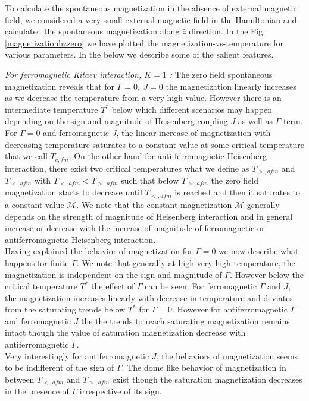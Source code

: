 \documentclass[aps,amsmath,twocolumn,amssymb,floatfix,showpacs,superscriptaddress,nofootinbib,longbibliography]{revtex4-1}
\begin{document}
To calculate the spontaneous magnetization in the absence of external magnetic field, we considered a very small external magnetic field in the Hamiltonian and calculated the spontaneous magnetization along $\hat{z}$ direction. In the Fig. \ref{magnetizationhzzero} we have plotted the magnetization-vs-temperature for various parameters. In the below we describe some of the salient features.\\ 
\indent 

{\it \small{For ferromagnetic Kitaev interaction, $K=1$ :}} The zero field spontaneous magnetization reveals that for $\Gamma=0,~J=0$ the magnetization linearly increases as we decrease the temperature from a very high value. However there is an intermediate  temperature $T^*$ below which different scenarios may happen depending on the sign and magnitude of Heisenberg coupling $J$ as well as $\Gamma$ term. For $\Gamma=0$ and ferromagnetic $J$, the linear increase of magnetization with decreasing temperature saturates to a constant value at some critical temperature that we call $T_{c,fm}$. On the other hand for anti-ferromagnetic Heisenberg interaction, there exist two critical temperatures what we define as $T_{>,afm}$ and $T_{<,afm}$  with $ T_{<,afm} < T_{>,afm}$ such that below $T_{>,afm}$ the zero field magnetization starts to decrease  until $T_{<,afm}$ is reached and then it saturates to a constant value $\mathcal{M}$. We note that the constant magnetization $\mathcal{M}$ generally depends on the strength of magnitude of Heisenberg interaction and in general increase or decrease with the increase of magnitude of ferromagnetic or antiferromagnetic Heisenberg interaction. \\
Having explained the behavior of magnetization for $\Gamma=0$ we now describe what happens for finite $\Gamma$. We note that generally at high very high temperature, the magnetization is independent on the sign and magnitude of $\Gamma$. However below the critical temperature $T^*$ the effect of $\Gamma$ can be seen.
For ferromagnetic $\Gamma$ and $J$, the magnetization increases linearly with decrease in temperature and deviates from the saturating trends below $T^*$ for $\Gamma=0$. However for antiferromagnetic $\Gamma$ and ferromagnetic $J$ the the trends to reach  saturating magnetization remains intact though the value of saturation magnetization decrease with antiferromagnetic $\Gamma$. \\
Very interestingly for  antiferromagnetic $J$, the behaviors of magnetization seems to be indifferent of the sign of $\Gamma$. The dome like behavior of magnetization in between $T_{<,afm}$ and $T_{>,afm}$ exist though the saturation magnetization decreases in the presence of $\Gamma$ irrespective of its sign.\\
\end{document}
